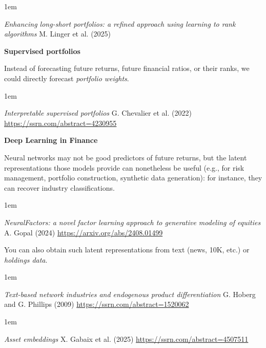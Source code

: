 \documentclass[a5paper]{article}
\newenvironment{reference}{%
  \medskip\goodbreak
  \parskip 0pt
  \raggedright
  \leftskip 1em
  \obeylines
}{\par\medskip\goodbreak}
\def\section#1{\clearpage{\vspace*{0cm}\LARGE\centering\bfseries #1\par\bigskip\bigskip}}
\def\subsection#1{{\par\bigskip\goodbreak\large\bfseries #1\par}}
\begin{document}
\begin{reference}
  \emph{Enhancing long-short portfolios: a refined approach using learning to rank algorithms}
  M. Linger et al. (2025)
\end{reference}

\subsection{Supervised portfolios}

Instead of forecasting future returns, future financial ratios, or their ranks,
we could directly forecast \emph{portfolio weights}.

\begin{reference}
  \emph{Interpretable supervised portfolios}
  G. Chevalier et al. (2022)
  \url{https://ssrn.com/abstract=4230955}
\end{reference}

\subsection{Deep Learning in Finance}

Neural networks may not be good predictors of future returns,
but the latent representations those models provide can nonetheless be useful
(e.g., for risk management, portfolio construction, synthetic data generation):
for instance, they can recover industry classifications.

\begin{reference}
  \emph{NeuralFactors: a novel factor learning approach to generative modeling of equities}
  A. Gopal (2024)
  \url{https://arxiv.org/abs/2408.01499}
\end{reference}

You can also obtain such latent representations from text (news, 10K, etc.) or \emph{holdings data}.

\begin{reference}
  \emph{Text-based network industries and endogenous product differentiation}
  G. Hoberg and G. Phillips (2009)
  \url{https://ssrn.com/abstract=1520062}
\end{reference}

\begin{reference}
  \emph{Asset embeddings}
  X. Gabaix et al. (2025)
  \url{https://ssrn.com/abstract=4507511}
\end{reference}

\section{Diffusion}
\end{document}
